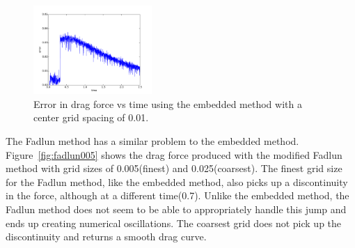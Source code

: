 \documentclass[onehalf,11pt]{beavtex}
\begin{document}
\begin{figure}[!htb]
	\centering
	\includegraphics[width=0.4\textwidth]{embedded_error_01}
	\caption{Error in drag force vs time using the embedded method with a center grid spacing of 0.01.}
	\label{fig:embeddederror005}
\end{figure}

The Fadlun method has a similar problem to the embedded method. 
Figure~\ref{fig:fadlun005} shows the drag force produced with the modified Fadlun method with grid sizes of 0.005(finest) and 0.025(coarsest).
The finest grid size for the Fadlun method, like the embedded method, also picks up a discontinuity in the force, although at a different time(0.7).
Unlike the embedded method, the Fadlun method does not seem to be able to appropriately handle this jump and ends up creating numerical oscillations. 
The coarsest grid does not pick up the discontinuity and returns a smooth drag curve. 
\end{document}
